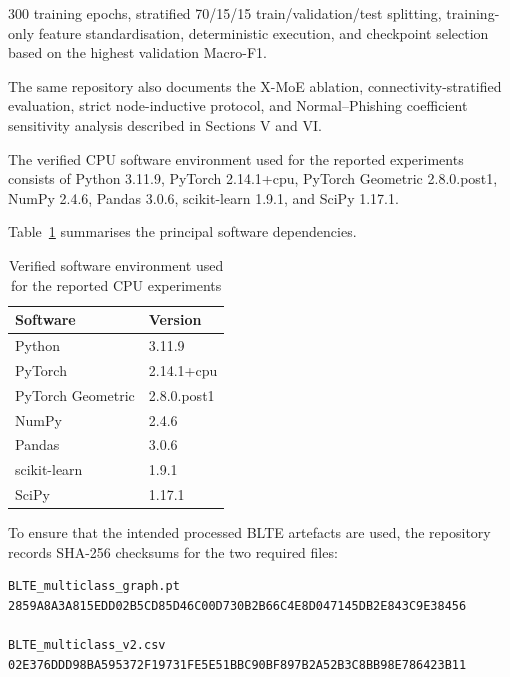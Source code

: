 \documentclass{ieeeaccess}
\begin{document}
300 training epochs, stratified 70/15/15 train/validation/test splitting, training-only feature standardisation, deterministic execution, and checkpoint selection based on the highest validation Macro-F1.

The same repository also documents the X-MoE ablation, connectivity-stratified evaluation, strict node-inductive protocol, and Normal--Phishing coefficient sensitivity analysis described in Sections V and VI.

The verified CPU software environment used for the reported experiments consists of Python 3.11.9, PyTorch 2.14.1+cpu, PyTorch Geometric 2.8.0.post1, NumPy 2.4.6, Pandas 3.0.6, scikit-learn 1.9.1, and SciPy 1.17.1.

Table~\ref{tab:reproducibility_environment} summarises the principal software dependencies.

\begin{table}[t]
\centering
\caption{Verified software environment used for the reported CPU experiments}
\label{tab:reproducibility_environment}

\renewcommand{\arraystretch}{1.12}
\setlength{\tabcolsep}{5pt}
\scriptsize

\begin{tabular}{ll}
\toprule
\textbf{Software} & \textbf{Version} \\
\midrule

Python & 3.11.9 \\
PyTorch & 2.14.1+cpu \\
PyTorch Geometric & 2.8.0.post1 \\
NumPy & 2.4.6 \\
Pandas & 3.0.6 \\
scikit-learn & 1.9.1 \\
SciPy & 1.17.1 \\

\bottomrule
\end{tabular}
\end{table}

To ensure that the intended processed BLTE artefacts are used, the repository records SHA-256 checksums for the two required files:

{\scriptsize
\begin{verbatim}
BLTE_multiclass_graph.pt
2859A8A3A815EDD02B5CD85D46C00D730B2B66C4E8D047145DB2E843C9E38456

BLTE_multiclass_v2.csv
02E376DDD98BA595372F19731FE5E51BBC90BF897B2A52B3C8BB98E786423B11
\end{verbatim}
}
\end{document}

